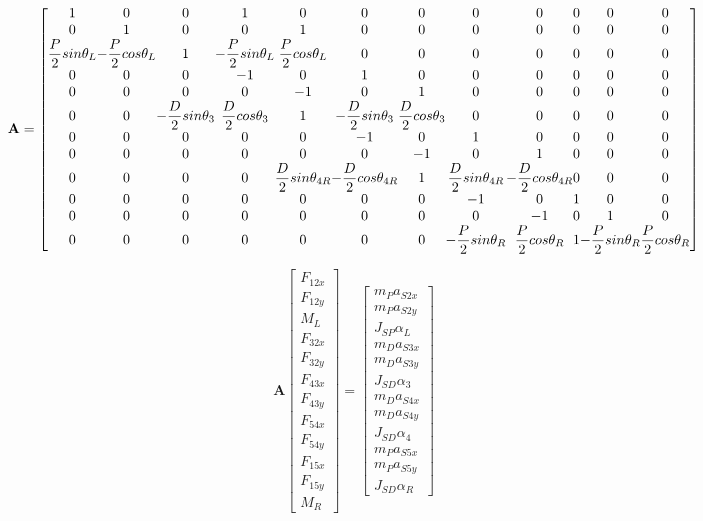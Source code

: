 \documentclass[12pt]{article}
\begin{document}
\footnotesize
\begin{equation}
\textbf{A}=
\begingroup %
\setlength\arraycolsep{0pt}
\left[
\begin{array}{cccccccccccc}
1 & 0 & 0 & 1 & 0 & 0 & 0 & 0 & 0 & 0 & 0 & 0 \\
0 & 1 & 0 & 0 & 1 & 0 & 0 & 0 & 0 & 0 & 0 & 0 \\
\dfrac{P}{2}sin\theta_L & -\dfrac{P}{2}cos\theta_L & 1 & -\dfrac{P}{2}sin\theta_L & \dfrac{P}{2}cos\theta_L & 0 & 0 & 0 & 0 & 0 & 0 & 0 \\
0 & 0 & 0 & -1 & 0 & 1 & 0 & 0 & 0 & 0 & 0 & 0 \\
0 & 0 & 0 & 0 & -1 & 0 & 1 & 0 & 0 & 0 & 0 & 0 \\
0 & 0 & -\dfrac{D}{2}sin\theta_3 & \dfrac{D}{2}cos\theta_3 & 1 & -\dfrac{D}{2}sin\theta_3 & \dfrac{D}{2}cos\theta_3 & 0 & 0 & 0 & 0 & 0 \\
0 & 0 & 0 & 0 & 0 & -1 & 0 & 1 & 0 & 0 & 0 & 0 \\
0 & 0 & 0 & 0 & 0 & 0 & -1 & 0 & 1 & 0 & 0 & 0 \\
0 & 0 & 0 & 0 & \dfrac{D}{2}sin\theta_{4R} & -\dfrac{D}{2}cos\theta_{4R} & 1 & \dfrac{D}{2}sin\theta_{4R} & -\dfrac{D}{2}cos\theta_{4R} & 0 & 0 & 0 \\
0 & 0 & 0 & 0 & 0 & 0 & 0 & -1 & 0 & 1 & 0 & 0 \\
0 & 0 & 0 & 0 & 0 & 0 & 0 & 0 & -1 & 0 & 1 & 0 \\
0 & 0 & 0 & 0 & 0 & 0 & 0 & -\dfrac{P}{2}sin\theta_R & \dfrac{P}{2}cos\theta_R & 1 & -\dfrac{P}{2}sin\theta_R & \dfrac{P}{2}cos\theta_R
\end{array}
\right]
\endgroup
\end{equation}
\normalsize

\begin{equation}
\textbf{A}
\begin{bmatrix}
F_{12x}\\
F_{12y}\\
M_L\\
F_{32x}\\
F_{32y}\\
F_{43x}\\
F_{43y}\\
F_{54x}\\
F_{54y}\\
F_{15x}\\
F_{15y}\\
M_R
\end{bmatrix}
=
\begin{bmatrix}
m_Pa_{S2x}\\
m_Pa_{S2y}\\
J_{SP}\alpha_L\\
m_Da_{S3x}\\
m_Da_{S3y}\\
J_{SD}\alpha_3\\
m_Da_{S4x}\\
m_Da_{S4y}\\
J_{SD}\alpha_4\\
m_Pa_{S5x}\\
m_Pa_{S5y}\\
J_{SD}\alpha_R
\end{bmatrix}
\end{equation}
\end{document}
